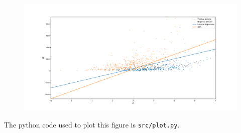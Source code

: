 \begin{answer}
	\begin{figure}[h]
		\centering
		\includegraphics[width=1.0\linewidth]{01-linreg/assets/dataset1}
		\caption[Dataset 1 And Decision Boundaries]{}
		\label{fig:dataset1}
	\end{figure}
	
	The python code used to plot this figure is \texttt{src/plot.py}.
\end{answer}